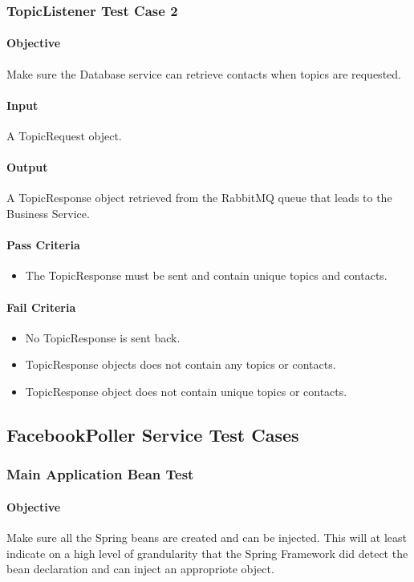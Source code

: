 \documentclass[hidelinks,english]{article}
\begin{document}
			\subsubsection{TopicListener Test Case 2}\label{databasetopiclistenertest2}
				\paragraph{Objective} Make sure the Database service can retrieve contacts when topics are requested.
				\paragraph{Input} A TopicRequest object.
				\paragraph{Output} A TopicResponse object retrieved from the RabbitMQ queue that leads to the Business Service.
				\paragraph{Pass Criteria}
				\begin{itemize}
					\item The TopicResponse must be sent and contain unique topics and contacts.
				\end{itemize}
				\paragraph{Fail Criteria}
				\begin{itemize}
					\item No TopicResponse is sent back.
					\item TopicResponse objects does not contain any topics or contacts.
					\item TopicResponse object does not contain unique topics or contacts.
				\end{itemize}
				
		\subsection{FacebookPoller Service Test Cases}
			\subsubsection{Main Application Bean Test}\label{facebookapplicationbeanstest}
				\paragraph{Objective} Make sure all the Spring beans are created and can be injected. This will at least indicate on a high level of grandularity that the Spring Framework did detect the bean declaration and can inject an appropriote object.
\end{document}
